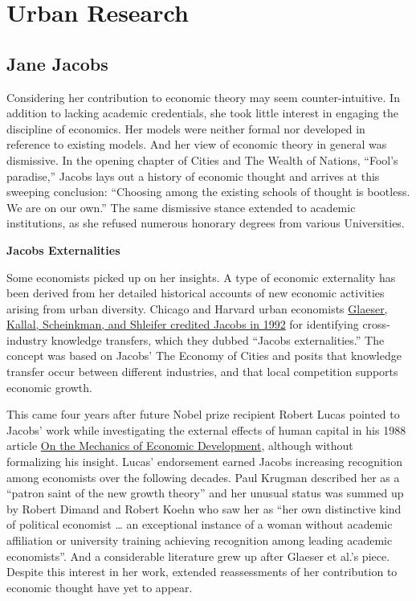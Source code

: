 \documentclass[
]{book}
\begin{document}
\hypertarget{urban-research}{%
\chapter{Urban Research}\label{urban-research}}

\hypertarget{jane-jacobs}{%
\section{Jane Jacobs}\label{jane-jacobs}}

Considering her contribution to economic theory may seem counter-intuitive. In addition to lacking academic credentials, she took little interest in engaging the discipline of economics. Her models were neither formal nor developed in reference to existing models. And her view of economic theory in general was dismissive. In the opening chapter of Cities and The Wealth of Nations, ``Fool's paradise,'' Jacobs lays out a history of economic thought and arrives at this sweeping conclusion: ``Choosing among the existing schools of thought is bootless. We are on our own.'' The same dismissive stance extended to academic institutions, as she refused numerous honorary degrees from various Universities.

\textbf{Jacobs Externalities}

Some economists picked up on her insights. A type of economic externality has been derived from her detailed historical accounts of new economic activities arising from urban diversity. Chicago and Harvard urban economists \href{https://www.nber.org/papers/w3787}{Glaeser, Kallal, Scheinkman, and Shleifer credited Jacobs in 1992} for identifying cross-industry knowledge transfers, which they dubbed ``Jacobs externalities.''
The concept was based on Jacobs' The Economy of Cities and posits that knowledge transfer occur between different industries, and that local competition supports economic growth.

This came four years after future Nobel prize recipient Robert Lucas pointed to Jacobs' work while investigating the external effects of human capital in his 1988 article
\href{https://www.sciencedirect.com/science/article/abs/pii/0304393288901687}{On the Mechanics of Economic Development},
although without formalizing his insight.
Lucas' endorsement earned Jacobs increasing recognition among economists over the following decades.
Paul Krugman described her as a ``patron saint of the new growth theory'' and her unusual status
was summed up by Robert Dimand and Robert Koehn who saw her as
``her own distinctive kind of political economist \ldots{}
an exceptional instance of a woman without academic affiliation or university training
achieving recognition among leading academic economists''.
And a considerable literature grew up after Glaeser et al.'s piece.
Despite this interest in her work, extended reassessments of her contribution
to economic thought have yet to appear.
\end{document}
